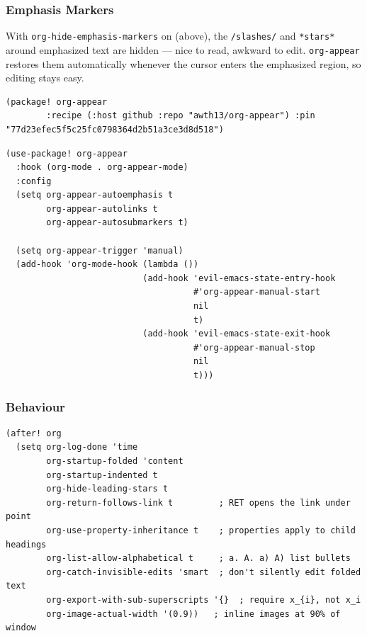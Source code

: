 \documentclass[11pt]{article}
\begin{document}
\subsubsection{Emphasis Markers}
\label{sec:org822b585}
With \texttt{org-hide-emphasis-markers} on (above), the \texttt{/slashes/} and
\texttt{*stars*} around emphasized text are hidden — nice to read, awkward to
edit. \texttt{org-appear} restores them automatically whenever the cursor
enters the emphasized region, so editing stays easy.

\begin{verbatim}
(package! org-appear
        :recipe (:host github :repo "awth13/org-appear") :pin "77d23efec5f5c25fc0798364d2b51a3ce3d8d518")

\end{verbatim}

\begin{verbatim}
(use-package! org-appear
  :hook (org-mode . org-appear-mode)
  :config
  (setq org-appear-autoemphasis t
        org-appear-autolinks t
        org-appear-autosubmarkers t)

  (setq org-appear-trigger 'manual)
  (add-hook 'org-mode-hook (lambda ())
                           (add-hook 'evil-emacs-state-entry-hook
                                     #'org-appear-manual-start
                                     nil
                                     t)
                           (add-hook 'evil-emacs-state-exit-hook
                                     #'org-appear-manual-stop
                                     nil
                                     t)))
\end{verbatim}
\subsubsection{Behaviour}
\label{sec:orga018083}

\begin{verbatim}
(after! org
  (setq org-log-done 'time
        org-startup-folded 'content
        org-startup-indented t
        org-hide-leading-stars t
        org-return-follows-link t         ; RET opens the link under point
        org-use-property-inheritance t    ; properties apply to child headings
        org-list-allow-alphabetical t     ; a. A. a) A) list bullets
        org-catch-invisible-edits 'smart  ; don't silently edit folded text
        org-export-with-sub-superscripts '{}  ; require x_{i}, not x_i
        org-image-actual-width '(0.9))   ; inline images at 90% of window
\end{verbatim}
\end{document}
